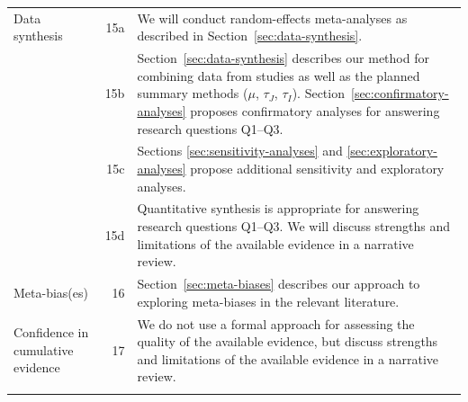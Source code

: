 \documentclass[10pt, a4paper]{article}
\begin{document}
\begin{tabularx}{\linewidth}{lrX}
Data synthesis & 15a & We will conduct random-effects meta-analyses as described in Section~\ref{sec:data-synthesis}. \\
~~~~ & 15b & Section~\ref{sec:data-synthesis} describes our method for combining data from studies as well as the planned summary methods ($\mu$, $\tau_J$, $\tau_I$). Section~\ref{sec:confirmatory-analyses} proposes confirmatory analyses for answering research questions Q1--Q3.\\
~~~~ & 15c & Sections \ref{sec:sensitivity-analyses} and \ref{sec:exploratory-analyses} propose additional sensitivity and exploratory analyses. \\
~~~~ & 15d & Quantitative synthesis is appropriate for answering research questions Q1--Q3. We will discuss strengths and limitations of the available evidence in a narrative review. \\ \addlinespace
Meta-bias(es) & 16 & Section~\ref{sec:meta-biases} describes our approach to exploring meta-biases in the relevant literature. \\ \addlinespace
Confidence in cumulative evidence & 17 & We do not use a formal approach for assessing the quality of the available evidence, but discuss strengths and limitations of the available evidence in a narrative review.\\
\addlinespace \bottomrule
\end{tabularx}



\end{document}
